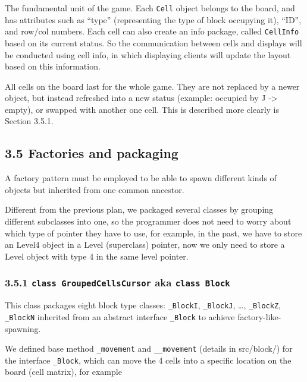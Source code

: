 \documentclass[
]{article}
\begin{document}
The fundamental unit of the game. Each \texttt{Cell} object belongs to
the board, and has attributes such as ``type'' (representing the type of
block occupying it), ``ID'', and row/col numbers. Each cell can also
create an info package, called \texttt{CellInfo} based on its current
status. So the communication between cells and displays will be
conducted using cell info, in which displaying clients will update the
layout based on this information.

All cells on the board last for the whole game. They are not replaced by
a newer object, but instead refreshed into a new status (example:
occupied by J -\textgreater{} empty), or swapped with another one cell.
This is described more clearly is Section 3.5.1.

\hypertarget{factories-and-packaging}{%
\subsection{3.5 Factories and packaging}\label{factories-and-packaging}}

A factory pattern must be employed to be able to spawn different kinds
of objects but inherited from one common ancestor.

Different from the previous plan, we packaged several classes by
grouping different subclasses into one, so the programmer does not need
to worry about which type of pointer they have to use, for example, in
the past, we have to store an Level4 object in a Level (superclass)
pointer, now we only need to store a Level object with type 4 in the
same level pointer.

\hypertarget{class-groupedcellscursor-aka-class-block}{%
\subsubsection{\texorpdfstring{3.5.1 \texttt{class\ GroupedCellsCursor}
aka
\texttt{class\ Block}}{3.5.1 class GroupedCellsCursor aka class Block}}\label{class-groupedcellscursor-aka-class-block}}

This class packages eight block type classes: \texttt{\_BlockI},
\texttt{\_BlockJ}, \ldots, \texttt{\_BlockZ}, \texttt{\_BlockN}
inherited from an abstract interface \texttt{\_Block} to achieve
factory-like-spawning.

We defined base method \texttt{\_movement} and \texttt{\_\_movement}
(details in src/block/) for the interface \texttt{\_Block}, which can
move the 4 cells into a specific location on the board (cell matrix),
for example
\end{document}
